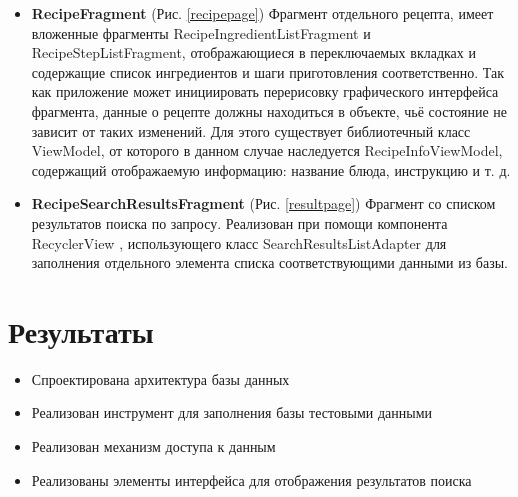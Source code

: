 \documentclass[14pt]{matmex-diploma-custom}
\begin{document}
\begin{itemize}  
\item \textbf{RecipeFragment} (Рис. \ref{recipepage}) Фрагмент отдельного рецепта, имеет вложенные фрагменты RecipeIngredientListFragment и\\ RecipeStepListFragment, отображающиеся в переключаемых вкладках и содержащие список ингредиентов и шаги приготовления соответственно. Так как приложение может инициировать перерисовку графического интерфейса фрагмента, данные о рецепте должны находиться в объекте, чьё состояние не зависит от таких изменений. Для этого существует библиотечный класс ViewModel, от которого в данном случае наследуется RecipeInfoViewModel, содержащий отображаемую информацию: название блюда, инструкцию и т. д.
\item \textbf{RecipeSearchResultsFragment} (Рис. \ref{resultpage}) Фрагмент со списком результатов поиска по запросу. Реализован при помощи компонента RecyclerView \cite{recycler}, использующего класс SearchResultsListAdapter для заполнения отдельного элемента списка соответствующими данными из базы.
\end{itemize}



\newpage
\section*{Результаты}

\begin{itemize}  
\item Спроектирована архитектура базы данных
\item Реализован инструмент для заполнения базы тестовыми данными
\item Реализован механизм доступа к данным
\item Реализованы элементы интерфейса для отображения результатов поиска
\end{itemize}

\setmonofont[Mapping=tex-text]{CMU Typewriter Text}


\end{document}
